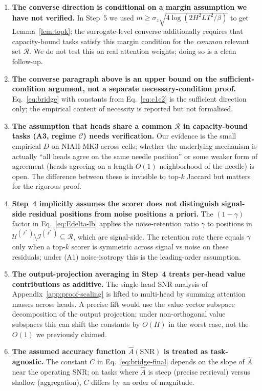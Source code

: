 \documentclass{article}
\begin{document}
\begin{enumerate}
  alternative for readers who reject the surrogate-level amplification
  argument.
  \item \textbf{The converse direction is conditional on a margin
  assumption we have not verified.} In Step~5 we used $m \geq \sigma_z
  \sqrt{4 \log(2 H^2 L T^2 / \beta)}$ to get Lemma~\ref{lem:topk}; the
  surrogate-level converse additionally requires that capacity-bound
  tasks satisfy this margin condition for the \emph{common} relevant
  set $\mathcal{R}$. We do not test this on real attention weights;
  doing so is a clean follow-up.
  \item \textbf{The converse paragraph above is an upper bound on the
  sufficient-condition argument, not a separate necessary-condition
  proof.} Eq.~\eqref{eq:bridge} with constants from
  Eq.~\eqref{eq:c1c2} is the sufficient direction only; the empirical
  content of necessity is reported but not formalised.
  \item \textbf{The assumption that heads share a common $\mathcal{R}$
  in capacity-bound tasks (A3, regime $\mathcal{C}$) needs verification.}
  Our evidence is the small empirical $D$ on NIAH-MK3 across cells;
  whether the underlying mechanism is actually ``all heads agree on the
  same needle position'' or some weaker form of agreement (heads
  agreeing on a length-$O(1)$ neighborhood of the needle) is open. The
  difference between these is invisible to top-$k$ Jaccard but matters
  for the rigorous proof.
  \item \textbf{Step~4 implicitly assumes the scorer does not
  distinguish signal-side residual positions from noise positions a
  priori.} The $(1 - \gamma)$ factor in Eq.~\eqref{eq:Edelta-lb} applies
  the noise-retention ratio $\gamma$ to positions in
  $\mathcal{U}^{(\ell^*)} \setminus \mathcal{I}^{(\ell^*)}
  \subseteq \mathcal{R}$, which are signal-side. The retention rate
  there equals $\gamma$ only when a top-$k$ scorer is symmetric across
  signal vs noise on these residuals; under (A1) noise-isotropy this is
  the leading-order assumption.
  \item \textbf{The output-projection averaging in Step~4 treats
  per-head value contributions as additive.} The single-head SNR
  analysis of Appendix~\ref{app:proof-scaling} is lifted to multi-head
  by summing attention masses across heads. A precise lift would use
  the value-vector subspace decomposition of the output projection;
  under non-orthogonal value subspaces this can shift the constants by
  $O(H)$ in the worst case, not the $O(1)$ we previously claimed.
  \item \textbf{The assumed accuracy function $\hat A(\mathrm{SNR})$ is
  treated as task-agnostic.} The constant $C$ in Eq.~\eqref{eq:bridge-final}
  depends on the slope of $\hat A$ near the operating SNR; on tasks where
  $\hat A$ is steep (precise retrieval) versus shallow (aggregation), $C$
  differs by an order of magnitude.
\end{enumerate}
\end{document}
